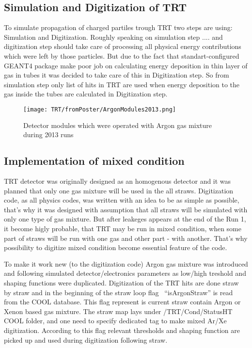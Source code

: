 \subsection{Simulation and Digitization of TRT}

To simulate propagation of charged partiles trough TRT two steps are using: Simulation and Digitization. 
Roughly speaking on simulation step .... and digitization step should take care of processing all physical energy contributions which were left by those particles.
But due to the fact that standart-configured GEANT4 package make poor job on calculating energy deposition in thin layer of gas in tubes it was decided to take care 
of this in Digitization step. So from simulation step only list of hits in TRT are used when energy deposition to the gas inside the tubes are calculated in Digitization step.


\begin{figure}
\begin{center}
 \texttt{[image: TRT/fromPoster/ArgonModules2013.png]}
\caption{\label{fig:argonModulesIn2013} Detector modules which were operated with Argon gas mixture during 2013 runs}
\end{center}
\end{figure}





\subsection{Implementation of mixed condition}
TRT detector was originally designed as an homogenous detector and it was planned that only one gas mixture will be used in the all straws. 
Digitization code, as all physics codes, was written with an idea to be as simple as possible, that's why it was designed with assumption that all straws will be simulated with only one type of gas mixture.
But after leakeges appears at the end of the Run 1, it become higly probable, that TRT may be run in mixed condition, when some part of straws will be run with one gas and other part - with another. That's why 
possibility to digitize mixed condition become essential feature of the code. 

To make it work new (to the digitization code) Argon gas mixture was introduced and following simulated detector/electronics parameters as low/high treshold and shaping functions were duplicated.
Digitization of the TRT hits are done straw by straw and in the beginning of the straw loop flag \mbox{ ``isArgonStraw''} is read from the COOL database. This flag represent is current straw contain Argon or Xenon based 
gas mixture. The straw map lays under \mbox{/TRT/Cond/StatusHT} COOL folder, and one need to specify dedicated tag to make mixed Ar/Xe digitization.
According to this flag relevant thresholds and shaping function are picked up and used during digitization following straw. 


